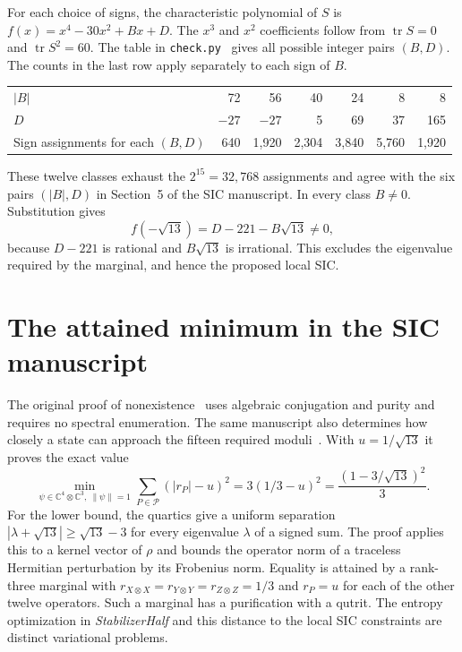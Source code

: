\documentclass[11pt,a4paper]{article}
\newcommand{\tr}{\operatorname{tr}}
\newcommand{\C}{\mathbb C}
\newcommand{\Pset}{\mathcal P}
\begin{document}
For each choice of signs, the characteristic polynomial of $S$ is
$f(x)=x^4-30x^2+Bx+D$. The $x^3$ and $x^2$ coefficients follow from $\tr S=0$ and $\tr S^2=60$. The table in \texttt{check.py}~\cite{half} gives all possible integer pairs $(B,D)$. The counts in the last row apply separately to each sign of $B$.
\begin{center}
\begin{tabular}{lrrrrrr}
\toprule
$|B|$ & 72 & 56 & 40 & 24 & 8 & 8\\
$D$ & $-27$ & $-27$ & 5 & 69 & 37 & 165\\
Sign assignments for each $(B,D)$ & 640 & 1,920 & 2,304 & 3,840 & 5,760 & 1,920\\
\bottomrule
\end{tabular}
\end{center}
These twelve classes exhaust the $2^{15}=32{,}768$ assignments and agree with the six pairs $(|B|,D)$ in Section~5 of the SIC manuscript. In every class $B\ne0$. Substitution gives
\[
        f(-\sqrt{13})=D-221-B\sqrt{13}\ne0,
\]
because $D-221$ is rational and $B\sqrt{13}$ is irrational. This excludes the eigenvalue required by the marginal, and hence the proposed local SIC.

\newpage
\section*{The attained minimum in the SIC manuscript}
The original proof of nonexistence~\cite[Sec.~2]{sic} uses algebraic conjugation and purity and requires no spectral enumeration. The same manuscript also determines how closely a state can approach the fifteen required moduli~\cite[Sec.~5]{sic}. With $u=1/\sqrt{13}$ it proves the exact value
\[
  \min_{\psi\in\C^4\otimes\C^3,\ \|\psi\|=1}
      \sum_{P\in\Pset} (|r_P|-u)^2
       =3(1/3-u)^2=\frac{(1-3/\sqrt{13})^2}{3}.
\]
For the lower bound, the quartics give a uniform separation
$|\lambda+\sqrt{13}|\ge\sqrt{13}-3$ for every eigenvalue $\lambda$ of a signed sum. The proof applies this to a kernel vector of $\rho$ and bounds the operator norm of a traceless Hermitian perturbation by its Frobenius norm. Equality is attained by a rank-three marginal with $r_{X\otimes X}=r_{Y\otimes Y}=r_{Z\otimes Z}=1/3$ and $r_P=u$ for each of the other twelve operators. Such a marginal has a purification with a qutrit. The entropy optimization in \emph{StabilizerHalf} and this distance to the local SIC constraints are distinct variational problems.
\end{document}
